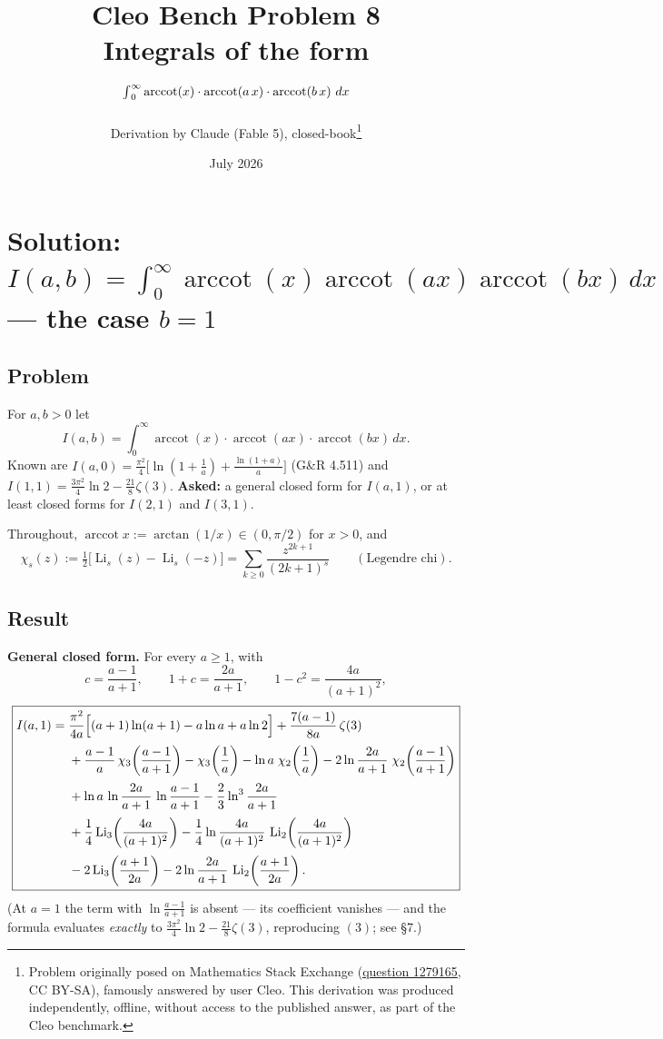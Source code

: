 \documentclass[11pt]{article}
\title{Cleo Bench Problem 8\\[1ex]\large Integrals of the form ${\large\int}_0^\infty\operatorname{arccot}(x)\cdot\operatorname{arccot}(a\,x)\cdot\operatorname{arccot}(b\,x)\ dx$}
\author{Derivation by Claude (Fable 5), closed-book\thanks{Problem originally
posed on Mathematics Stack Exchange
(\href{https://math.stackexchange.com/q/1279165}{question 1279165}, CC BY-SA),
famously answered by user Cleo. This derivation was produced independently,
offline, without access to the published answer, as part of the Cleo benchmark.}}
\date{July 2026}
\theoremstyle{remark}
\begin{document}
\maketitle

\section*{Solution: $\displaystyle I(a,b)=\int_0^\infty\operatorname{arccot}(x)\operatorname{arccot}(ax)\operatorname{arccot}(bx)\,dx$ --- the case $b=1$}

\subsection*{Problem}

For $a,b>0$ let
\[I(a,b)=\int_0^\infty\operatorname{arccot}(x)\cdot\operatorname{arccot}(a x)\cdot\operatorname{arccot}(b x)\,dx .\]
Known are $I(a,0)=\frac{\pi^2}{4}\bigl[\ln(1+\tfrac1a)+\tfrac{\ln(1+a)}{a}\bigr]$ (G\&R 4.511) and
$I(1,1)=\frac{3\pi^2}{4}\ln 2-\frac{21}{8}\zeta(3)$.
\textbf{Asked:} a general closed form for $I(a,1)$, or at least closed forms for $I(2,1)$ and $I(3,1)$.

Throughout, $\operatorname{arccot}x:=\arctan(1/x)\in(0,\pi/2)$ for $x>0$, and
\[\chi_s(z):=\tfrac12\bigl[\operatorname{Li}_s(z)-\operatorname{Li}_s(-z)\bigr]=\sum_{k\ge0}\frac{z^{2k+1}}{(2k+1)^s}\qquad(\text{Legendre chi}).\]

\subsection*{Result}

\textbf{General closed form.} For every $a\ge 1$, with
\[c=\frac{a-1}{a+1},\qquad 1+c=\frac{2a}{a+1},\qquad 1-c^2=\frac{4a}{(a+1)^2},\]
\[\boxed{\begin{aligned}
I(a,1)=\;&\frac{\pi^2}{4a}\Bigl[(a+1)\ln(a+1)-a\ln a+a\ln2\Bigr]+\frac{7(a-1)}{8a}\,\zeta(3)\\[2pt]
&+\frac{a-1}{a}\,\chi_3\!\left(\frac{a-1}{a+1}\right)-\chi_3\!\left(\frac1a\right)-\ln a\;\chi_2\!\left(\frac1a\right)-2\ln\frac{2a}{a+1}\;\chi_2\!\left(\frac{a-1}{a+1}\right)\\[2pt]
&+\ln a\,\ln\frac{2a}{a+1}\,\ln\frac{a-1}{a+1}-\frac23\ln^3\frac{2a}{a+1}\\[2pt]
&+\frac14\operatorname{Li}_3\!\left(\frac{4a}{(a+1)^2}\right)-\frac14\ln\frac{4a}{(a+1)^2}\,\operatorname{Li}_2\!\left(\frac{4a}{(a+1)^2}\right)\\[2pt]
&-2\operatorname{Li}_3\!\left(\frac{a+1}{2a}\right)-2\ln\frac{2a}{a+1}\,\operatorname{Li}_2\!\left(\frac{a+1}{2a}\right).
\end{aligned}}\]
(At $a=1$ the term with $\ln\frac{a-1}{a+1}$ is absent --- its coefficient vanishes --- and the formula evaluates \emph{exactly} to $\frac{3\pi^2}{4}\ln 2-\frac{21}{8}\zeta(3)$, reproducing $(3)$; see \S7.)
\end{document}
